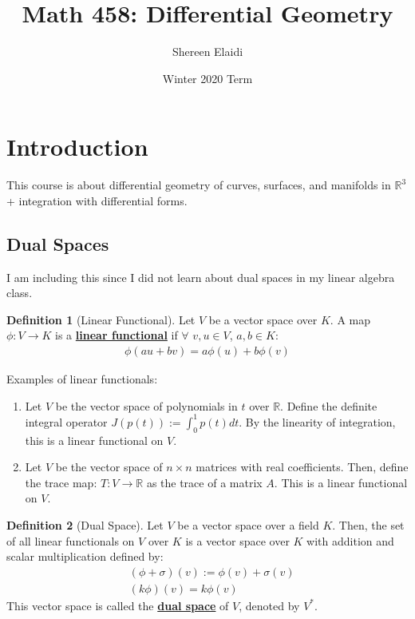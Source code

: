 \documentclass[11pt]{scrartcl}
\title{\textbf{Math 458: Differential Geometry}}
\author{Shereen Elaidi}
\date{Winter 2020 Term}
\newcommand{\R}[0]{\mathbb{R}}
\theoremstyle{definition}
\newtheorem{definition}{Definition}
\theoremstyle{remark}
\newcommand{\dfn}[1]{\textbf{\underline{#1}}}
\newcommand{\idx}[2]{\int_{#1}^{#2}}
\begin{document}
\maketitle
\tableofcontents
\pagestyle{fancy}
\lfoot{}
\cfoot{}
\rfoot{}
\renewcommand{\headrulewidth}{0.4pt}
\renewcommand{\footrulewidth}{0.4pt}
\setlength{\tabcolsep}{0.5em} %
{\renewcommand{\arraystretch}{1.2}%

\section{Introduction}
This course is about differential geometry of curves, surfaces, and manifolds in $\R^3$ + integration with differential forms. 
\subsection{Dual Spaces}
I am including this since I did not learn about dual spaces in my linear algebra class.

\begin{definition}[Linear Functional]
	Let $V$ be a vector space over $K$. A map $\phi: V \rightarrow K$ is a \dfn{linear functional} if $\forall$ $v , u \in V$, $a, b \in K$: 
	\begin{align}
		\phi(au+ bv) = a \phi(u) + b \phi(v) 	
	\end{align}
\end{definition}
Examples of linear functionals: 
\begin{enumerate}[noitemsep]
	\item Let $V$ be the vector space of polynomials in $t$ over $\R$. Define the definite integral operator $J(p(t)):= \idx{0}{1} p(t)dt$. By the linearity of integration, this is a linear functional on $V$. 
	\item Let $V$ be the vector space of $n \times n$ matrices with real coefficients. Then, define the trace map: $T: V \rightarrow \R$ as the trace of a matrix $A$. This is a linear functional on $V$. 
\end{enumerate}

\begin{definition}[Dual Space]
	Let $V$ be a vector space over a field $K$. Then, the set of all linear functionals on $V$ over $K$ is a vector space over $K$ with addition and scalar multiplication defined by: 
	\begin{align*}
		& (\phi + \sigma)(v) := \phi(v) + \sigma(v)  \\
		& (k \phi)(v) = k \phi(v) 
	\end{align*}
	This vector space is called the \dfn{dual space} of $V$, denoted by $V^*$. 
\end{definition}

}
\end{document}
